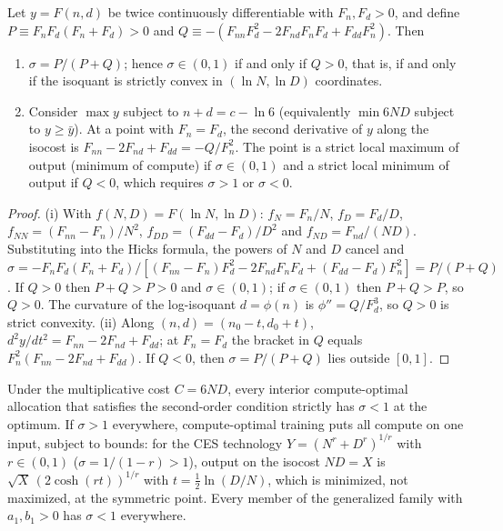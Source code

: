 \begin{lemma}\label{lem:soc}
Let $y=F(n,d)$ be twice continuously differentiable with $F_n,F_d>0$, and define $P\equiv F_nF_d(F_n+F_d)>0$ and
$Q\equiv-(F_{nn}F_d^2-2F_{nd}F_nF_d+F_{dd}F_n^2)$. Then
\begin{enumerate}
\item[(i)] $\sigma=P/(P+Q)$; hence $\sigma\in(0,1)$ if and only if $Q>0$, that is, if and only if the isoquant is
strictly convex in $(\ln N,\ln D)$ coordinates.
\item[(ii)] Consider $\max y$ subject to $n+d=c-\ln6$ (equivalently $\min 6ND$ subject to $y\ge\bar y$). At a point with
$F_n=F_d$, the second derivative of $y$ along the isocost is $F_{nn}-2F_{nd}+F_{dd}=-Q/F_n^2$. The point is a strict
local maximum of output (minimum of compute) if $\sigma\in(0,1)$ and a strict local minimum of output if $Q<0$, which
requires $\sigma>1$ or $\sigma<0$.
\end{enumerate}
\end{lemma}

\begin{proof}
(i) With $f(N,D)=F(\ln N,\ln D)$: $f_N=F_n/N$, $f_D=F_d/D$, $f_{NN}=(F_{nn}-F_n)/N^2$, $f_{DD}=(F_{dd}-F_d)/D^2$ and
$f_{ND}=F_{nd}/(ND)$. Substituting into the Hicks formula, the powers of $N$ and $D$ cancel and
$\sigma=-F_nF_d(F_n+F_d)/[(F_{nn}-F_n)F_d^2-2F_{nd}F_nF_d+(F_{dd}-F_d)F_n^2]=P/(P+Q)$. If $Q>0$ then $P+Q>P>0$ and
$\sigma\in(0,1)$; if $\sigma\in(0,1)$ then $P+Q>P$, so $Q>0$. The curvature of the log-isoquant $d=\phi(n)$ is
$\phi''=Q/F_d^3$, so $Q>0$ is strict convexity. (ii) Along $(n,d)=(n_0-t,d_0+t)$, $d^2y/dt^2=F_{nn}-2F_{nd}+F_{dd}$; at
$F_n=F_d$ the bracket in $Q$ equals $F_n^2(F_{nn}-2F_{nd}+F_{dd})$. If $Q<0$, then $\sigma=P/(P+Q)$ lies outside
$[0,1]$.
\end{proof}

\begin{corollary}\label{cor:complements}
Under the multiplicative cost $C=6ND$, every interior compute-optimal allocation that satisfies the second-order
condition strictly has $\sigma<1$ at the optimum. If $\sigma>1$ everywhere, compute-optimal training puts all compute on
one input, subject to bounds: for the CES technology $Y=(N^r+D^r)^{1/r}$ with $r\in(0,1)$ ($\sigma=1/(1-r)>1$), output
on the isocost $ND=X$ is $\sqrt X\,(2\cosh(rt))^{1/r}$ with $t=\tfrac12\ln(D/N)$, which is minimized, not maximized,
at the symmetric point. Every member of the generalized family with $a_1,b_1>0$ has $\sigma<1$ everywhere.
\end{corollary}

